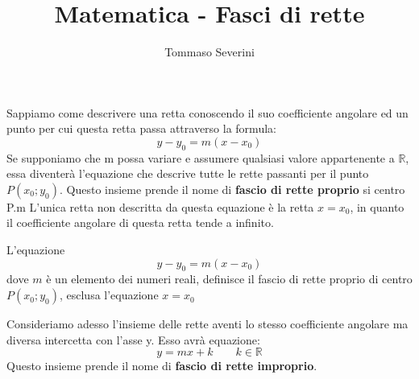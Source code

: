\documentclass[10pt,a4paper]{article}
\author{Tommaso Severini}
\title{Matematica - Fasci di rette}
\begin{document}
	
	
	\maketitle
	
	Sappiamo come descrivere una retta conoscendo il suo coefficiente angolare ed un punto per cui questa retta passa attraverso la formula:
	\begin{equation*}
			y - y_0 = m(x - x_0)
	\end{equation*} 
	Se supponiamo che m possa variare e assumere qualsiasi valore appartenente a $\mathbb{R}$, essa diventerà l'equazione che descrive tutte le rette passanti per il punto $P(x_0; y_0)$. Questo insieme prende il nome di \textbf{fascio di rette proprio} si centro P.m L'unica retta non descritta da questa equazione è la retta $x = x_0$, in quanto il coefficiente angolare di questa retta tende a infinito.
	
	\begin{definition}
		L'equazione 
		\begin{equation*}
				y - y_0 = m(x - x_0)
		\end{equation*}
	dove $m$ è un elemento dei numeri reali, definisce il fascio di rette proprio di centro $P(x_0; y_0)$, esclusa l'equazione $x = x_0$
	\end{definition}

\begin{center}
\end{center}

Consideriamo adesso l'insieme delle rette aventi lo stesso coefficiente angolare ma diversa intercetta con l'asse y. Esso avrà equazione:
\begin{equation*}
	y = mx + k		\qquad	k \in \mathbb{R}
\end{equation*}
Questo insieme prende il nome di \textbf{fascio di rette improprio}.
	
\end{document}
